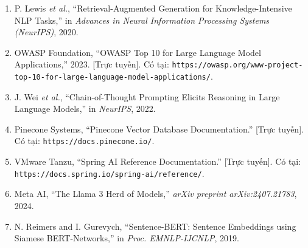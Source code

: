 \documentclass[../DoAn.tex]{subfiles}
\begin{document}
\begin{enumerate}
\item[{[1]}] P. Lewis \textit{et al.}, ``Retrieval-Augmented Generation for Knowledge-Intensive NLP Tasks,'' in \textit{Advances in Neural Information Processing Systems (NeurIPS)}, 2020.
\item[{[2]}] OWASP Foundation, ``OWASP Top 10 for Large Language Model Applications,'' 2023. [Trực tuyến]. Có tại: \texttt{https://owasp.org/www-project-top-10-for-large-language-model-applications/}.
\item[{[3]}] J. Wei \textit{et al.}, ``Chain-of-Thought Prompting Elicits Reasoning in Large Language Models,'' in \textit{NeurIPS}, 2022.
\item[{[4]}] Pinecone Systems, ``Pinecone Vector Database Documentation.'' [Trực tuyến]. Có tại: \texttt{https://docs.pinecone.io/}.
\item[{[5]}] VMware Tanzu, ``Spring AI Reference Documentation.'' [Trực tuyến]. Có tại: \texttt{https://docs.spring.io/spring-ai/reference/}.
\item[{[6]}] Meta AI, ``The Llama 3 Herd of Models,'' \textit{arXiv preprint arXiv:2407.21783}, 2024.
\item[{[7]}] N. Reimers and I. Gurevych, ``Sentence-BERT: Sentence Embeddings using Siamese BERT-Networks,'' in \textit{Proc. EMNLP-IJCNLP}, 2019.
\end{enumerate}
\end{document}
